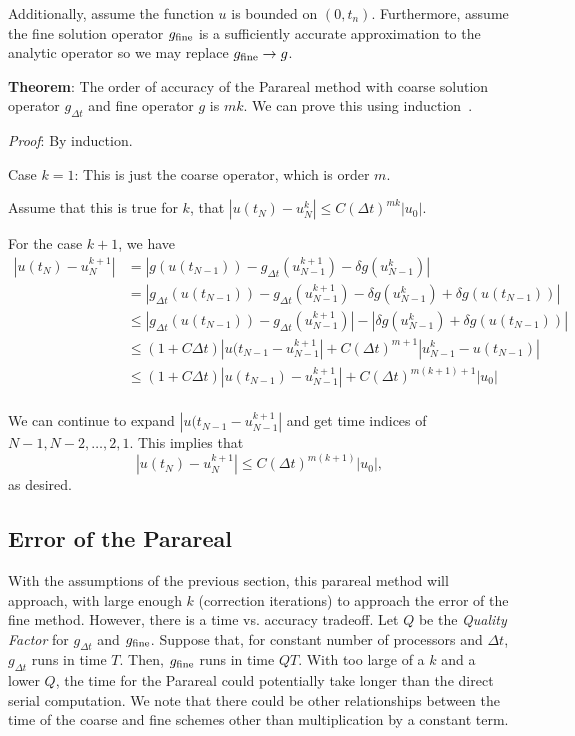 \documentclass[letterpaper,12pt]{article}
\begin{document}
Additionally, assume the function $u$ is bounded on $(0, t_n)$. Furthermore,
assume the fine solution operator $g_{\textnormal{fine}}$ is a sufficiently
accurate approximation to the analytic operator so we may replace
$g_{\textnormal{fine}} \to g$. 

\textbf{Theorem}: The order of accuracy of the Parareal method with coarse
solution operator $g_{\Delta t}$ and fine operator $g$ is $mk$. We can prove
this using induction~\cite{bal2005convergence}. 

\emph{Proof}: By induction. 

Case $k = 1$: This is just the coarse operator, which is order $m$. 

Assume that this is true for $k$, that $|u(t_N) - u^k_N| \leq C(\Delta t)^{mk}
|u_0|$. 

For the case $k + 1$, we have
\[
\begin{aligned}
    |u(t_N) - u^{k+1}_N| &= 
    |g(u(t_{N-1})) - g_{\Delta t}(u^{k+1}_{N-1}) - \delta g(u^k_{N-1})| \\
    &= |g_{\Delta t}(u(t_{N-1})) - g_{\Delta t}(u^{k+1}_{N-1}) - \delta
    g(u^k_{N-1}) + \delta g(u(t_{N-1}))| \\
    &\leq |g_{\Delta t}(u(t_{N-1})) - g_{\Delta t}(u^{k+1}_{N-1})| - |\delta
    g(u^k_{N-1}) + \delta g(u(t_{N-1}))| \\
    &\leq (1 + C \Delta t) |u(t_{N-1} - u_{N-1}^{k+1}| + C(\Delta t)^{m+1} |
    u_{N-1}^k - u(t_{N-1}) | \\
    &\leq (1 + C \Delta t) |u(t_{N-1}) - u_{N-1}^{k+1}| + C(\Delta t)^{m(k+1)+1}
    | u_0 | \\
\end{aligned}
\]

We can continue to expand $|u(t_{N-1} - u_{N-1}^{k+1}|$ and get time indices of
$N-1, N-2, \ldots, 2, 1$. This implies that 
\[ |u(t_N) - u^{k+1}_N| \leq C(\Delta t)^{m(k+1)} |u_0|, \]
as desired. 

\subsection{Error of the Parareal}

With the assumptions of the previous section, this parareal method will
approach, with large enough $k$ (correction iterations) to approach the error of
the fine method. However, there is a time vs. accuracy tradeoff. Let $Q$ be the
\emph{Quality Factor} for $g_{\Delta t}$ and $g_{\textnormal{fine}}$. Suppose
that, for constant number of processors and $\Delta t$, $g_{\Delta t}$ runs in
time $T$. Then, $g_{\textnormal{fine}}$ runs in time $QT$. With too large of a
$k$ and a lower $Q$, the time for the Parareal could potentially take longer
than the direct serial computation. We note that there could be other
relationships between the time of the coarse and fine schemes other than
multiplication by a constant term. 
\end{document}
